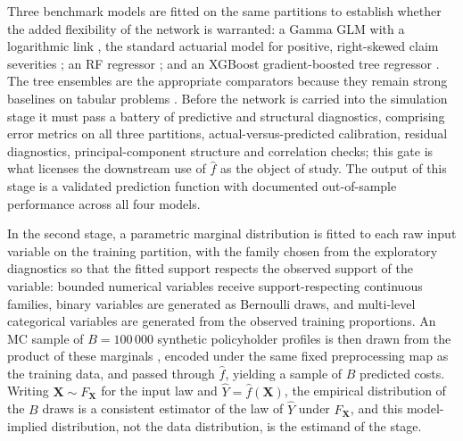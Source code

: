 Three benchmark models are fitted on the same partitions to establish
whether the added flexibility of the network is warranted: a Gamma GLM
with a logarithmic link
\citep{nelder1972generalized, mccullagh1989generalized}, the standard
actuarial model for positive, right-skewed claim severities
\citep{denuit2007actuarial, wuthrich2023statistical}; an RF regressor
\citep{breiman2001random}; and an XGBoost gradient-boosted tree regressor
\citep{chen2016xgboost}.  The tree ensembles are the appropriate
comparators because they remain strong baselines on tabular problems
\citep{grinsztajn2022why, shwartzziv2022tabular}.  Before the network is
carried into the simulation stage it must pass a battery of predictive
and structural diagnostics, comprising error metrics on all three
partitions, actual-versus-predicted calibration, residual diagnostics,
principal-component structure and correlation checks; this gate is what
licenses the downstream use of $\hat{f}$ as the object of study.  The
output of this stage is a validated prediction function with documented
out-of-sample performance across all four models.

In the second stage, a parametric marginal distribution is fitted to each
raw input variable on the training partition, with the family chosen from
the exploratory diagnostics so that the fitted support respects the
observed support of the variable: bounded numerical variables receive
support-respecting continuous families, binary variables are generated as
Bernoulli draws, and multi-level categorical variables are generated from
the observed training proportions.  An MC sample of $B = 100\,000$
synthetic policyholder profiles is then drawn from the product of these
marginals \citep{rubinstein2016simulation, robert2004monte}, encoded
under the same fixed preprocessing map as the training data, and passed
through $\hat{f}$, yielding a sample of $B$ predicted costs.  Writing
$\mathbf{X} \sim F_{\mathbf{X}}$ for the input law and
$\hat{Y} = \hat{f}(\mathbf{X})$, the empirical distribution of the
$B$ draws is a consistent estimator of the law of $\hat{Y}$ under
$F_{\mathbf{X}}$, and this model-implied distribution, not the data
distribution, is the estimand of the stage.

